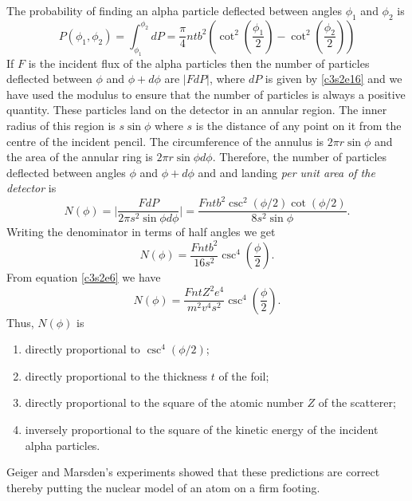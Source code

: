 The probability of finding an alpha particle deflected between angles $\phi_1$
and $\phi_2$ is
\begin{equation}\label{c3s2e17}
P(\phi_1, \phi_2) = \int_{\phi_1}^{\phi_2}dP = \frac{\pi}{4}ntb^2\left(
\cot^2\left(\frac{\phi_1}{2}\right) - \cot^2\left(\frac{\phi_2}{2}\right)\right)
\end{equation}
If $F$ is the incident flux of the alpha particles then the number of particles
deflected between $\phi$ and $\phi + d\phi$ are $|FdP|$, where $dP$ is given 
by \eqref{c3s2e16} and we have used the modulus to ensure that the number of
particles is always a positive quantity. These particles land on the detector in
an annular region. The inner radius of this region is $s\sin\phi$ where $s$ is
the distance of any point on it from the centre of the incident pencil. The
circumference of the annulus is $2\pi r\sin\phi$ and the area of the annular
ring is $2\pi r\sin\phi d\phi$. Therefore, the number of particles deflected
between angles $\phi$ and $\phi + d\phi$ and and landing \emph{per unit area of 
the detector} is
\begin{equation}\label{c3s2e18}
N(\phi) = \Big|\frac{FdP}{2\pi s^2\sin\phi d\phi}\Big| = 
\frac{Fnt b^2\csc^2(\phi/2)\cot(\phi/2)}{8s^2\sin\phi}.
\end{equation}
Writing the denominator in terms of half angles we get
\begin{equation}\label{c3s2e19}
N(\phi) = \frac{Fntb^2}{16s^2}\csc^4\left(\frac{\phi}{2}\right).
\end{equation}
From equation \eqref{c3s2e6} we have
\begin{equation}\label{c3s2e20}
N(\phi) = \frac{FntZ^2e^4}{m^2v^4s^2}\csc^4\left(\frac{\phi}{2}\right).
\end{equation}
Thus, $N(\phi)$ is
\begin{enumerate}
\item directly proportional to $\csc^4(\phi/2)$;
\item directly proportional to the thickness $t$ of the foil;
\item directly proportional to the square of the atomic number $Z$ of the 
scatterer;
\item inversely proportional to the square of the kinetic energy of the incident
alpha particles. 
\end{enumerate}
Geiger and Marsden's experiments \cite{geiger1913lxi} showed that these
predictions are correct thereby putting the nuclear model of an atom on a firm
footing.

